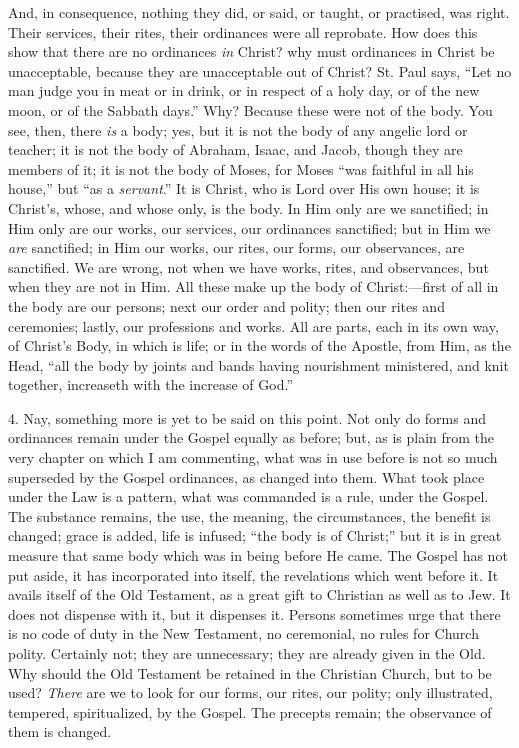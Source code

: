And, in consequence, nothing they did, or said, or taught, or
practised, was right. Their services, their rites, their ordinances
were all reprobate. How does this show that there are no ordinances \emph{in}
Christ? why must ordinances in Christ be unacceptable, because they
are unacceptable out of Christ? St. Paul says, ``Let no man judge
you in meat or in drink, or in respect of a holy day, or of the new
moon, or of the Sabbath days.'' Why? Because these were not of the
body. You see, then, there \emph{is} a body; yes, but it is not the
body of any angelic lord or teacher; it is not the body of Abraham,
Isaac, and Jacob, though they are members of it; it is not the body of
Moses, for Moses ``was faithful in all his house,'' but
``as a \emph{servant}.'' It is Christ, who is Lord over His
own house; it is Christ's, whose, and whose only, is the body. In Him
only are we sanctified; in Him only are our works, our services, our
ordinances sanctified; but in Him we \emph{are} sanctified; in Him our works,
our rites, our forms, our observances, are sanctified. We are wrong,
not when we have works, rites, and observances, but when they are not
in Him. All these make up the body of Christ:—first of all in the
body are our persons; next our order and polity; then our rites and
ceremonies; lastly, our professions and works. All are parts, each in
its own way, of Christ's Body, in which is life; or in the words of
the Apostle, from Him, as the Head, ``all the body by joints and
bands having nourishment ministered, and knit together, increaseth
with the increase of God.''

4. Nay, something more is yet to be said on this point. Not only do
forms and ordinances remain under the Gospel equally as before; but,
as is plain from the very chapter on which I am commenting, what was
in use before is not so much superseded by the Gospel ordinances, as
changed into them. What took place under the Law is a pattern, what
was commanded is a rule, under the Gospel. The substance remains, the
use, the meaning, the circumstances, the benefit is changed; grace is
added, life is infused; ``the body is of Christ;'' but it is
in great measure that same body which was in being before He came. The
Gospel has not put aside, it has incorporated into itself, the
revelations which went before it. It avails itself of the Old
Testament, as a great gift to Christian as well as to Jew. It does not
dispense with it, but it dispenses it. Persons sometimes urge that
there is no code of duty in the New Testament, no ceremonial, no rules
for Church polity. Certainly not; they are unnecessary; they are
already given in the Old. Why should the Old Testament be retained in
the Christian Church, but to be used? \emph{There} are we to look for
our forms, our rites, our polity; only illustrated, tempered,
spiritualized, by the Gospel. The precepts remain; the observance of
them is changed.

